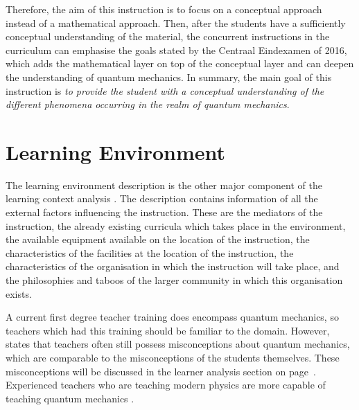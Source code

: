 \documentclass[11pt,twoside]{report} %
\begin{document}
Therefore, the aim of this instruction is to focus on a conceptual approach instead of a mathematical approach. Then, after the students have a sufficiently conceptual understanding of the material, the concurrent instructions in the curriculum can emphasise the goals stated by the Centraal Eindexamen of 2016, which adds the mathematical layer on top of the conceptual layer and can deepen the understanding of quantum mechanics. In summary, the main goal of this instruction is \emph{to provide the student with a conceptual understanding of the different phenomena occurring in the realm of quantum mechanics}.


\section{Learning Environment}

The learning environment description is the other major component of the learning context analysis \cite{smithragan}. The description contains information of all the external factors influencing the instruction. These are the mediators of the instruction, the already existing curricula which takes place in the environment, the available equipment available on the location of the instruction, the characteristics of the facilities at the location of the instruction, the characteristics of the organisation in which the instruction will take place, and the philosophies and taboos of the larger community in which this organisation exists.

A current first degree teacher training \cite{leraarnatuurkundemaster} does encompass quantum mechanics, so teachers which had this training should be familiar to the domain. However,  states that teachers often still possess misconceptions about quantum mechanics, which are comparable to the misconceptions of the students themselves. These misconceptions will be discussed in the learner analysis section on page~\pageref{ch:learneranalysis}. Experienced teachers who are teaching modern physics are more capable of teaching quantum mechanics \cite{asikainen}.
\end{document}
